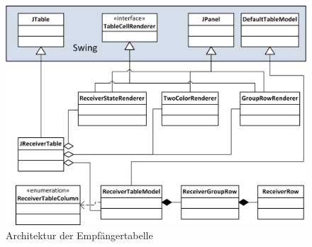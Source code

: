     \begin{figure}
        \includegraphics[width=15cm]{images/JReceiverTable.png}
        \centering
        \caption{Architektur der Empfängertabelle}
        \label{jreceivertable}
    \end{figure}